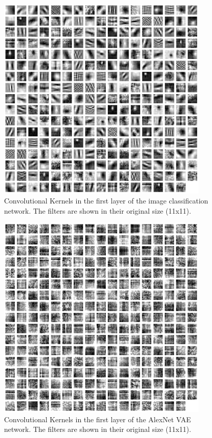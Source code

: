 \begin{figure}
    \centering
    \includegraphics[width=0.9\textwidth]{images/alexnet_classification_l1_kernels.png}
    \caption[Image classification - Layer 1 Kernels]{Convolutional Kernels in the first layer of the image classification network. The filters are shown in their original size (11x11).}
    \label{fig:classification_layer1_kernels}
\end{figure}

\begin{figure}
    \centering
    \includegraphics[width=0.9\textwidth]{images/alexnet_vae_l1_kernels.png}
    \caption[VAE - Layer 1 Kernels]{Convolutional Kernels in the first layer of the AlexNet \ac{VAE} network. The filters are shown in their original size (11x11).}
    \label{fig:vae_layer1_kernels}
\end{figure}

